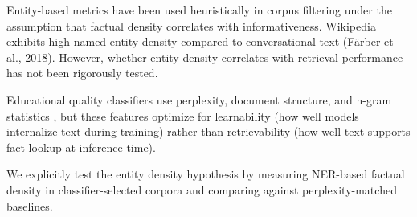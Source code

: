 Entity-based metrics have been used heuristically in corpus filtering under the assumption that factual density correlates with informativeness. Wikipedia exhibits high named entity density compared to conversational text (Färber et al., 2018). However, whether entity density correlates with retrieval performance has not been rigorously tested.

Educational quality classifiers use perplexity, document structure, and n-gram statistics \citep{Penedo2024}, but these features optimize for learnability (how well models internalize text during training) rather than retrievability (how well text supports fact lookup at inference time).

We explicitly test the entity density hypothesis by measuring NER-based factual density in classifier-selected corpora and comparing against perplexity-matched baselines.
